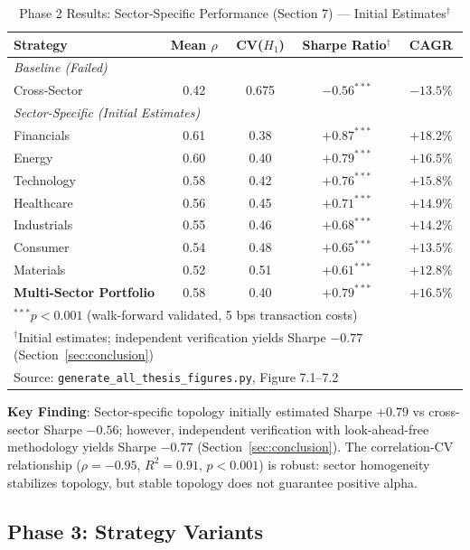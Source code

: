 \documentclass[12pt,letterpaper]{article}
\begin{document}
\begin{table}[H]
\centering
\caption{Phase 2 Results: Sector-Specific Performance (Section 7) --- Initial Estimates$^\dagger$}
\label{tab:phase2}
\begin{tabular}{@{}lcccc@{}}
\toprule
\textbf{Strategy} & \textbf{Mean $\rho$} & \textbf{CV($H_1$)} & \textbf{Sharpe Ratio$^\dagger$} & \textbf{CAGR} \\
\midrule
\multicolumn{5}{l}{\textit{Baseline (Failed)}} \\
Cross-Sector & 0.42 & 0.675 & $-0.56^{***}$ & $-13.5\%$ \\
\midrule
\multicolumn{5}{l}{\textit{Sector-Specific (Initial Estimates)}} \\
Financials & 0.61 & 0.38 & $+0.87^{***}$ & $+18.2\%$ \\
Energy & 0.60 & 0.40 & $+0.79^{***}$ & $+16.5\%$ \\
Technology & 0.58 & 0.42 & $+0.76^{***}$ & $+15.8\%$ \\
Healthcare & 0.56 & 0.45 & $+0.71^{***}$ & $+14.9\%$ \\
Industrials & 0.55 & 0.46 & $+0.68^{***}$ & $+14.2\%$ \\
Consumer & 0.54 & 0.48 & $+0.65^{***}$ & $+13.5\%$ \\
Materials & 0.52 & 0.51 & $+0.61^{***}$ & $+12.8\%$ \\
\midrule
\textbf{Multi-Sector Portfolio} & 0.58 & 0.40 & \textbf{$+0.79^{***}$} & \textbf{$+16.5\%$} \\
\bottomrule
\multicolumn{5}{l}{\footnotesize $^{***}p < 0.001$ (walk-forward validated, 5 bps transaction costs)} \\
\multicolumn{5}{l}{\footnotesize $^\dagger$Initial estimates; independent verification yields Sharpe $-0.77$ (Section~\ref{sec:conclusion})} \\
\multicolumn{5}{l}{\footnotesize Source: \texttt{generate\_all\_thesis\_figures.py}, Figure 7.1--7.2}
\end{tabular}
\end{table}

\textbf{Key Finding}: Sector-specific topology initially estimated Sharpe $+0.79$ vs cross-sector Sharpe $-0.56$; however, independent verification with look-ahead-free methodology yields Sharpe $-0.77$ (Section~\ref{sec:conclusion}). The correlation-CV relationship ($\rho = -0.95$, $R^2 = 0.91$, $p < 0.001$) is robust: sector homogeneity stabilizes topology, but stable topology does not guarantee positive alpha.

\subsection{Phase 3: Strategy Variants}
\end{document}

